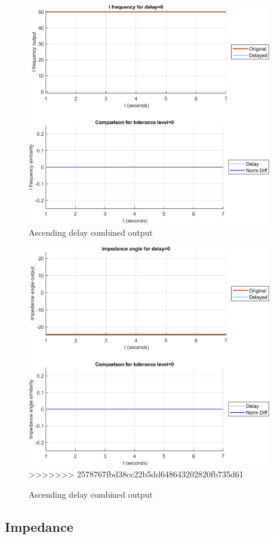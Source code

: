 \begin{figure}[hb]
    \includegraphics[width=0.95\textwidth]{PMUsim-figures/DelayOf_0/Zero_iFrequency_0.png}    
    \caption{Ascending delay combined output}
    \label{fig:PMUsim_Zero_iFrequency_0}
\end{figure}

\begin{figure}[hb]
    \includegraphics[width=0.95\textwidth]{PMUsim-figures/DelayOf_0/Zero_iAngle_0.png}    
>>>>>>> 2578767fbd38cc22b5dd648643202820fb735d61
    \caption{Ascending delay combined output}
    \label{fig:PMUsim_Zero_iAngle}
\end{figure}

\subsection{Impedance}
